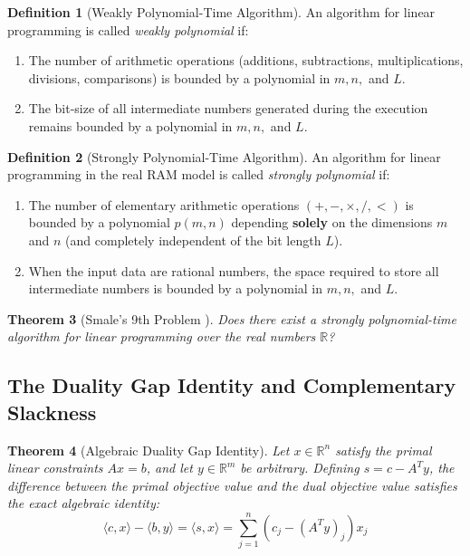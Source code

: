 \documentclass[11pt,a4paper]{article}
\newtheorem{theorem}{Theorem}[section]
\theoremstyle{definition}
\newtheorem{definition}[theorem]{Definition}
\begin{document}
\begin{definition}[Weakly Polynomial-Time Algorithm]\label{def:weakly_poly}
An algorithm for linear programming is called \emph{weakly polynomial} if:
\begin{enumerate}
    \item The number of arithmetic operations (additions, subtractions, multiplications, divisions, comparisons) is bounded by a polynomial in $m, n,$ and $L$.
    \item The bit-size of all intermediate numbers generated during the execution remains bounded by a polynomial in $m, n,$ and $L$.
\end{enumerate}
\end{definition}

\begin{definition}[Strongly Polynomial-Time Algorithm]\label{def:strongly_poly}
An algorithm for linear programming in the real RAM model is called \emph{strongly polynomial} if:
\begin{enumerate}
    \item The number of elementary arithmetic operations $(+, -, \times, /, <)$ is bounded by a polynomial $p(m, n)$ depending \textbf{solely} on the dimensions $m$ and $n$ (and completely independent of the bit length $L$).
    \item When the input data are rational numbers, the space required to store all intermediate numbers is bounded by a polynomial in $m, n,$ and $L$.
\end{enumerate}
\end{definition}

\begin{theorem}[Smale's 9th Problem \cite{smale2000}]\label{thm:smale_9}
Does there exist a strongly polynomial-time algorithm for linear programming over the real numbers $\mathbb{R}$?
\end{theorem}

\subsection{The Duality Gap Identity and Complementary Slackness}

\begin{theorem}[Algebraic Duality Gap Identity]\label{thm:duality_gap}
Let $x \in \mathbb{R}^n$ satisfy the primal linear constraints $A x = b$, and let $y \in \mathbb{R}^m$ be arbitrary. Defining $s = c - A^T y$, the difference between the primal objective value and the dual objective value satisfies the exact algebraic identity:
\begin{equation}\label{eq:duality_gap_identity}
\langle c, x \rangle - \langle b, y \rangle = \langle s, x \rangle = \sum_{j=1}^n (c_j - (A^T y)_j) x_j
\end{equation}
\end{theorem}
\end{document}
